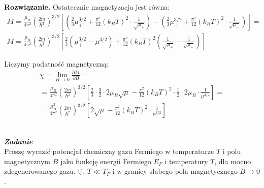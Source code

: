 \documentclass[11pt,a4paper]{article}
\newcounter{zadanie}\newcommand{\zadanie}[1][]{\addtocounter{zadanie}{1} ~\\ {\bf \emph{Zadanie \arabic{zadanie} #1 }} \\}
\newenvironment{solution}{\vspace{1cm} \par\textbf{Rozwiązanie.} \vspace{1cm}}{}
\begin{document}
\begin{solution}
Ostatecznie magnetyzacja jest równa:
\begin{align*}
M = \frac{\mu_B}{4\pi^{2}} \left( \frac{2m}{\hbar^2} \right)^{3/2}  \left[
\left( \frac{2}{3} \mu_{+}^{3/2} + \frac{\pi^2}{12} (k_B T)^2 \cdot \frac{1}{\sqrt{\mu_{+}}} \right) - 
\left( \frac{2}{3} \mu_{-}^{3/2} + \frac{\pi^2}{12} (k_B T)^2 \cdot \frac{1}{\sqrt{\mu_{-}}} \right)
\right] = \\
M = \frac{\mu_B}{4\pi^{2}} \left( \frac{2m}{\hbar^2} \right)^{3/2} \left[
\frac{2}{3} ( \mu_{+}^{3/2} - \mu_{-}^{3/2} ) +
\frac{\pi^2}{12} (k_B T)^2 \left( \frac{1}{\sqrt{\mu_{+}}} - \frac{1}{\sqrt{\mu_{-}}} \right)
\right] 
\end{align*}

Liczymy podatność magnetyczną:
\begin{align*}
\chi = \lim_{B \to 0} \frac{\partial M}{\partial B} = \\
= \frac{\mu_B}{4\pi^{2}} \left( \frac{2m}{\hbar^2} \right)^{3/2} \left[
\frac{2}{3} \cdot \frac{3}{2} \cdot 2 \mu_B \sqrt{\mu} -
\frac{\pi^2}{12} (k_B T)^2 \cdot \frac{1}{2} \cdot 2 \mu_B \cdot \frac{1}{\mu^{3/2}}
\right] = \\
= \frac{\mu_B^2}{4\pi^{2}} \left( \frac{2m}{\hbar^2} \right)^{3/2} \left[
2 \sqrt{\mu} - \frac{\pi^2}{12} (k_B T)^2 \cdot \frac{1}{\mu^{3/2}} \right]
\end{align*}

\newpage
\end{solution}
\zadanie[]

Proszę wyrazić potencjał chemiczny gazu Fermiego w temperaturze $T$ 
i polu magnetycznym $B$ jako funkcję energii Fermiego $E_F$ i temperatury $T$,
dla mocno zdegenerowanego gazu, tj. $T \ll T_F$ i w granicy słabego pola 
magnetycznego $B \to 0$.
\end{document}

